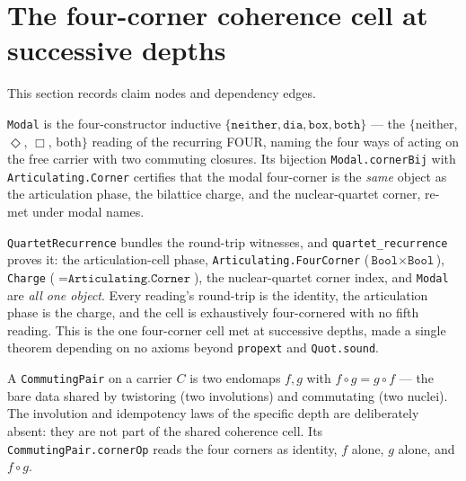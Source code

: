 \section{The four-corner coherence cell at successive depths}

This section records claim nodes and dependency edges.

\begin{theorem}\label{thm:modal}\leanok{}
\texttt{Modal} is the four-constructor inductive $\{\texttt{neither}, \texttt{dia}, \texttt{box}, \texttt{both}\}$ --- the $\{$neither, $\Diamond$, $\Box$, both$\}$ reading of the recurring FOUR, naming the four ways of acting on the free carrier with two commuting closures. Its bijection \texttt{Modal.cornerBij} with \texttt{Articulating.Corner} certifies that the modal four-corner is the \emph{same} object as the articulation phase, the bilattice charge, and the nuclear-quartet corner, re-met under modal names.
\end{theorem}
\begin{definition}\label{thm:quartet-recurrence}\leanok{}
\texttt{QuartetRecurrence} bundles the round-trip witnesses, and \texttt{quartet\_recurrence} proves it: the articulation-cell phase, \texttt{Articulating.FourCorner} ($\texttt{Bool} \times \texttt{Bool}$), \texttt{Charge} ($=\texttt{Articulating.Corner}$), the nuclear-quartet corner index, and \texttt{Modal} are \emph{all one object}. Every reading's round-trip is the identity, the articulation phase is the charge, and the cell is exhaustively four-cornered with no fifth reading. This is the one four-corner cell met at successive depths, made a single theorem depending on no axioms beyond \texttt{propext} and \texttt{Quot.sound}.
\end{definition}
\begin{proposition}\label{thm:commuting-pair}\leanok{}
A \texttt{CommutingPair} on a carrier $C$ is two endomaps $f, g$ with $f \circ g = g \circ f$ --- the bare data shared by twistoring (two involutions) and commutating (two nuclei). The involution and idempotency laws of the specific depth are deliberately absent: they are not part of the shared coherence cell. Its \texttt{CommutingPair.cornerOp} reads the four corners as identity, $f$ alone, $g$ alone, and $f \circ g$.
\end{proposition}
